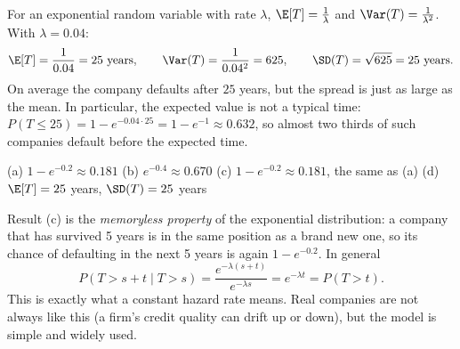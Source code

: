 \begin{solution}
	 For an exponential random variable with rate $\lambda$,
	$\E[T]=\frac1\lambda$ and $\Var(T)=\frac1{\lambda^2}$. With
	$\lambda=0.04$:
	\[ \E[T]=\frac1{0.04}=25\text{ years},\qquad
		\Var(T)=\frac1{0.04^2}=625,\qquad \SD(T)=\sqrt{625}=25\text{ years}. \]
	On average the company defaults after $25$ years, but the spread is just
	as large as the mean. In particular, the expected value is not a typical
	time: $P(T\le25)=1-e^{-0.04\cdot25}=1-e^{-1}\approx0.632$, so almost two
	thirds of such companies default before the expected time.

	\begin{answer}
		(a) $1-e^{-0.2}\approx0.181$ \quad
		(b) $e^{-0.4}\approx0.670$ \quad
		(c) $1-e^{-0.2}\approx0.181$, the same as (a) \quad
		(d) $\E[T]=25$ years, $\SD(T)=25$ years
	\end{answer}
	\begin{remark}
		Result (c) is the \emph{memoryless property} of the exponential
		distribution: a company that has survived 5 years is in the same
		position as a brand new one, so its chance of defaulting in the next
		5 years is again $1-e^{-0.2}$. In general
		\[
			P(T>s+t\mid T>s)=\dfrac{e^{-\lambda(s+t)}}{e^{-\lambda s}}
			=e^{-\lambda t}=P(T>t).
		\]
		This is exactly what a constant hazard rate means. Real companies are
		not always like this (a firm's credit quality can drift up or down),
		but the model is simple and widely used.
	\end{remark}
\end{solution}
